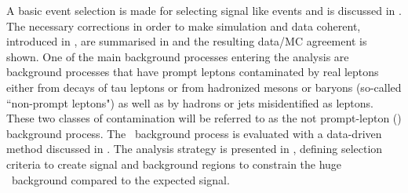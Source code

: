  A basic event selection is made for selecting signal like events and is discussed in . The necessary  corrections in order to make simulation and data coherent, introduced in , are summarised in  and the resulting data/MC agreement is shown. One of the main background processes entering the analysis are background processes that have  prompt leptons contaminated by real leptons either  from decays of tau leptons or from hadronized mesons or baryons
 (so-called ``non-prompt leptons") as well as by hadrons or jets misidentified as leptons.  These two classes  of contamination will be referred to as the not prompt-lepton (\NPL) background process. The \NPL\ background process is
 evaluated with a data-driven method discussed in . The analysis strategy is presented in , defining selection criteria to create signal and background regions to constrain the huge \SM\ background compared to the expected signal. %


